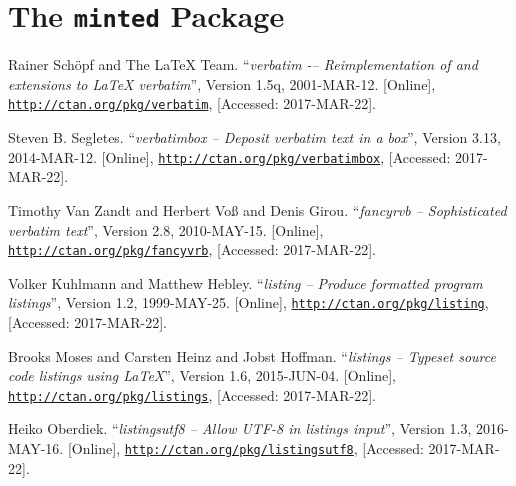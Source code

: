 \documentclass[article,a4paper,oneside,10pt]{memoir}
\newcommand\code[1]{\texttt{#1}}
\begin{document}
\chapter{The \code{minted}        Package \cite{minted}}
\label{chap:minted}



\vfill
\begin{thebibliography}{1}

        Rainer Sch\"opf and The \LaTeX{} Team.
        ``\emph{verbatim -– Reimplementation of and extensions to \LaTeX{} verbatim}'',
        Version 1.5q,
        2001-MAR-12.
        [Online],
        \href{http://ctan.org/pkg/verbatim}{\nolinkurl{http://ctan.org/pkg/verbatim}},
        [Accessed: 2017-MAR-22].

        Steven B. Segletes.
        ``\emph{verbatimbox – Deposit verbatim text in a box}'',
        Version 3.13,
        2014-MAR-12.
        [Online],
        \href{http://ctan.org/pkg/verbatimbox}{\nolinkurl{http://ctan.org/pkg/verbatimbox}},
        [Accessed: 2017-MAR-22].

        Timothy Van Zandt and Herbert Vo\ss{} and Denis Girou.
        ``\emph{fancyrvb -- Sophisticated verbatim text}'',
        Version 2.8,
        2010-MAY-15.
        [Online],
        \href{http://ctan.org/pkg/fancyvrb}{\nolinkurl{http://ctan.org/pkg/fancyvrb}},
        [Accessed: 2017-MAR-22].

        Volker Kuhlmann and Matthew Hebley.
        ``\emph{listing -- Produce formatted program listings}'',
        Version 1.2,
        1999-MAY-25.
        [Online],
        \href{http://ctan.org/pkg/listing}{\nolinkurl{http://ctan.org/pkg/listing}},
        [Accessed: 2017-MAR-22].

        Brooks Moses and Carsten Heinz and Jobst Hoffman.
        ``\emph{listings -- Typeset source code listings using \LaTeX}'',
        Version 1.6,
        2015-JUN-04.
        [Online],
        \href{http://ctan.org/pkg/listings}{\nolinkurl{http://ctan.org/pkg/listings}},
        [Accessed: 2017-MAR-22].

        Heiko Oberdiek.
        ``\emph{listingsutf8 -- Allow UTF-8 in listings input}'',
        Version 1.3,
        2016-MAY-16.
        [Online],
        \href{http://ctan.org/pkg/listingsutf8}{\nolinkurl{http://ctan.org/pkg/listingsutf8}},
        [Accessed: 2017-MAR-22].


\end{thebibliography}
\end{document}
